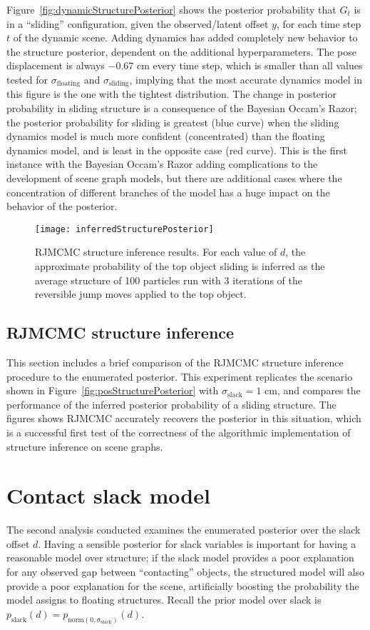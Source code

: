 Figure~\ref{fig:dynamicStructurePosterior} shows the posterior probability that $G_t$ is in a ``sliding'' configuration, given the observed/latent offset $y$, for each time step $t$ of the dynamic scene.
Adding dynamics has added completely new behavior to the structure posterior, dependent on the additional hyperparameters.
The pose displacement is always $-0.67$ cm every time step, which is smaller than all values tested for $\sigma_\mathrm{floating}$ and $\sigma_\mathrm{sliding}$, implying that the most accurate dynamics model in this figure is the one with the tightest distribution.
The change in posterior probability in sliding structure is a consequence of the Bayesian Occam's Razor; the posterior probability for sliding is greatest (blue curve) when the sliding dynamics model is much more confident (concentrated) than the floating dynamics model, and is least in the opposite case (red curve).
This is the first instance with the Bayesian Occam's Razor adding complications to the development of scene graph models, but there are additional cases where the concentration of different branches of the model has a huge impact on the behavior of the posterior.

\begin{figure}[H]
  \texttt{[image: inferredStructurePosterior]}
  \caption{
    RJMCMC structure inference results.
    For each value of $d$, the approximate probability of the top object sliding is inferred as the average structure of 100 particles run with 3 iterations of the reversible jump moves applied to the top object.
  }
  \label{fig:inferredStructurePosterior}
\end{figure}

\subsection{RJMCMC structure inference}
This section includes a brief comparison of the RJMCMC structure inference procedure to the enumerated posterior.
This experiment replicates the scenario shown in Figure~\ref{fig:posStructurePosterior} with $\sigma_\mathrm{slack} = 1$ cm, and compares the performance of the inferred posterior probability of a sliding structure.
The figures shows RJMCMC accurately recovers the posterior in this situation, which is a successful first test of the correctness of the algorithmic implementation of structure inference on scene graphs.

\section{Contact slack model}
The second analysis conducted examines the enumerated posterior over the slack offset $d$.
Having a sensible posterior for slack variables is important for having a reasonable model over structure; if the slack model provides a poor explanation for any observed gap between ``contacting'' objects, the structured model will also provide a poor explanation for the scene, artificially boosting the probability the model assigns to floating structures.
Recall the prior model over slack is $p_\mathrm{slack}(d) = p_\mathrm{norm(0,\sigma_\mathrm{slack})}(d)$.

